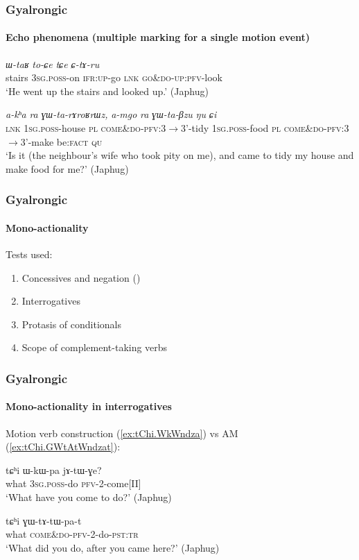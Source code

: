\documentclass[xcolor=table]{beamer}
\newcommand{\rouge}[1]{{\color{red}#1}}
\newcommand{\ipa}[1]{{\phon\textit{#1}}}
\begin{document}
\begin{frame} 
\frametitle{Gyalrongic}
 \framesubtitle{Echo phenomena (multiple marking for a single motion event)}

\begin{exe}
\ex \label{ex:CtAru}
\gll \ipa{tɕʰi} \ipa{ɯ-taʁ} \ipa{to-\rouge{ɕe}} \ipa{tɕe} \ipa{\rouge{ɕ}-tɤ-ru}   \\
stairs \textsc{3sg}.\textsc{poss}-on \textsc{ifr}:\textsc{up}-\rouge{go} \textsc{lnk}  \rouge{\textsc{go\&do}}-\textsc{up}:\textsc{pfv}-look \\
\glt `He \rouge{went} up the stairs and looked up.' (Japhug)
\end{exe}
\begin{exe}
\ex \label{ex:GWtaBzu}
\gll  \ipa{tɕe} 	\ipa{a-kʰa} 	\ipa{ra} 	\ipa{\rouge{ɣɯ}-ta-rɤroʁrɯz,} 	\ipa{a-mgo} 	\ipa{ra} 	\ipa{\rouge{ɣɯ}-ta-βzu} 	\ipa{ŋu} 	\ipa{ɕi} 
\\
\textsc{lnk} \textsc{1sg}.\textsc{poss}-house \textsc{pl} \rouge{\textsc{come\&do}}-\textsc{pfv}:3$\rightarrow$3'-tidy 
 \textsc{1sg}.\textsc{poss}-food \textsc{pl} \rouge{\textsc{come\&do}}-\textsc{pfv}:3$\rightarrow$3'-make be:\textsc{fact} \textsc{qu} \\ 
\glt `Is it (the neighbour's wife who took pity on me), and \rouge{came} to tidy my house and make food for me?' (Japhug)
\end{exe}
 \end{frame}   
 
 \begin{frame} 
\frametitle{Gyalrongic}
 \framesubtitle{Mono-actionality}
 Tests used:
\begin{enumerate}
\item<1-> Concessives and negation (\citealt{jacques13harmonization})
\item<2-> Interrogatives
\item<3-> Protasis of conditionals
\item<3-> Scope of complement-taking verbs
 \end{enumerate}
 \end{frame}  
 
  \begin{frame} 
\frametitle{Gyalrongic}
 \framesubtitle{Mono-actionality in interrogatives}
 Motion verb construction (\ref{ex:tChi.WkWndza}) vs AM (\ref{ex:tChi.GWtAtWndzat}):
\begin{exe}
\ex \label{ex:tChi.WkWndza}
\gll tɕʰi ɯ-kɯ-pa jɤ-tɯ-ɣe? \\
what \textsc{3sg.poss}-do \textsc{pfv}-2-come[II] \\
\glt `What have you come to do?' (Japhug)
\end{exe}

\begin{exe}
\ex \label{ex:tChi.GWtAtWndzat}
\gll tɕʰi \rouge{ɣɯ}-tɤ-tɯ-pa-t \\
what \rouge{\textsc{come\&do}}-\textsc{pfv}-2-do-\textsc{pst:tr}    \\
\glt `What did you do, after you \rouge{came} here?' (Japhug)
\end{exe} 
  \end{frame}  
  
\end{document}
